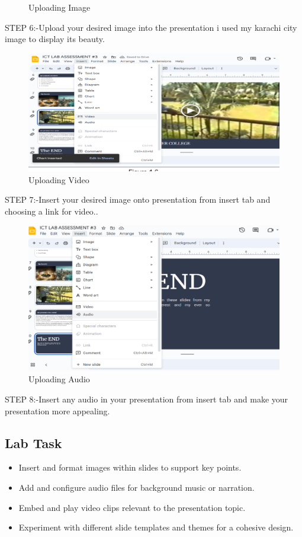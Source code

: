 \documentclass[a4paper,9pt]{article}
\begin{document}
\begin{enumerate}
\begin{figure}[H]
		\caption{Uploading Image}
	\end{figure}
	STEP 6:-Upload your desired image into the presentation i used my karachi city image to
	display its beauty.
	\begin{figure}[H]
		\centering
		\includegraphics[width=0.8\linewidth]{4.7.png}
		\caption{Uploading Video}
	\end{figure}
	STEP 7:-Insert your desired image onto presentation from insert tab and choosing a link
	for video..
	\begin{figure}[H]
		\centering
		\includegraphics[width=0.8\linewidth]{4.8.png}
		\caption{Uploading Audio}
	\end{figure}
	STEP 8:-Insert any audio in your presentation from insert tab and make your
	presentation more appealing.
	
\end{enumerate}

\subsection{Lab Task}

\begin{itemize}
	\item Insert and format images within slides to support key points.
	\item Add and configure audio files for background music or narration.
	\item Embed and play video clips relevant to the presentation topic.
	\item Experiment with different slide templates and themes for a cohesive design.
\end{itemize}
\end{document}
